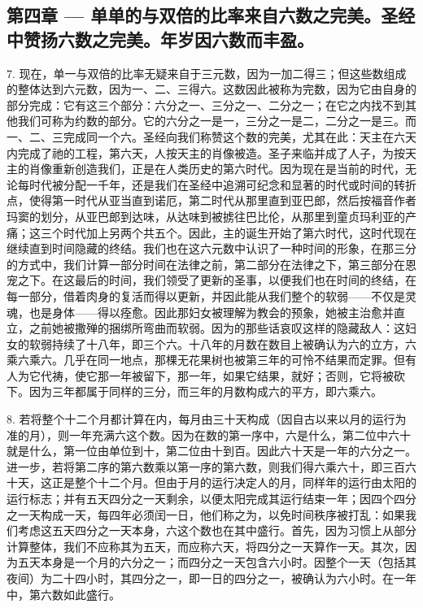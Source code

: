 
\subsection{第四章 — 单单的与双倍的比率来自六数之完美。圣经中赞扬六数之完美。年岁因六数而丰盈。}

7. 现在，单一与双倍的比率无疑来自于三元数，因为一加二得三；但这些数组成的整体达到六元数，因为一、二、三得六。这数因此被称为完数，因为它由自身的部分完成：它有这三个部分：六分之一、三分之一、二分之一；在它之内找不到其他我们可称为约数的部分。它的六分之一是一，三分之一是二，二分之一是三。而一、二、三完成同一个六。圣经向我们称赞这个数的完美，尤其在此：天主在六天内完成了祂的工程，第六天，人按天主的肖像被造。圣子来临并成了人子，为按天主的肖像重新创造我们，正是在人类历史的第六时代。因为现在是当前的时代，无论每时代被分配一千年，还是我们在圣经中追溯可纪念和显著的时代或时间的转折点，使得第一时代从亚当直到诺厄，第二时代从那里直到亚巴郎，然后按福音作者玛窦的划分，从亚巴郎到达味，从达味到被掳往巴比伦，从那里到童贞玛利亚的产痛；这三个时代加上另两个共五个。因此，主的诞生开始了第六时代，这时代现在继续直到时间隐藏的终结。我们也在这六元数中认识了一种时间的形象，在那三分的方式中，我们计算一部分时间在法律之前，第二部分在法律之下，第三部分在恩宠之下。在这最后的时间，我们领受了更新的圣事，以便我们也在时间的终结，在每一部分，借着肉身的复活而得以更新，并因此能从我们整个的软弱——不仅是灵魂，也是身体——得以痊愈。因此那妇女被理解为教会的预象，她被主治愈并直立，之前她被撒殚的捆绑所弯曲而软弱。因为的那些话哀叹这样的隐藏敌人：这妇女的软弱持续了十八年，即三个六。十八年的月数在数目上被确认为六的立方，六乘六乘六。几乎在同一地点，那棵无花果树也被第三年的可怜不结果而定罪。但有人为它代祷，使它那一年被留下，那一年，如果它结果，就好；否则，它将被砍下。因为三年都属于同样的三分，而三年的月数构成六的平方，即六乘六。\par

8. 若将整个十二个月都计算在内，每月由三十天构成（因自古以来以月的运行为准的月），则一年充满六这个数。因为在数的第一序中，六是什么，第二位中六十就是什么，第一位由单位到十，第二位由十到百。因此六十天是一年的六分之一。进一步，若将第二序的第六数乘以第一序的第六数，则我们得六乘六十，即三百六十天，这正是整个十二个月。但由于月的运行决定人的月，同样年的运行由太阳的运行标志；并有五天四分之一天剩余，以便太阳完成其运行结束一年；因四个四分之一天构成一天，每四年必须闰一日，他们称之为，以免时间秩序被打乱：如果我们考虑这五天四分之一天本身，六这个数也在其中盛行。首先，因为习惯上从部分计算整体，我们不应称其为五天，而应称六天，将四分之一天算作一天。其次，因为五天本身是一个月的六分之一；而四分之一天包含六小时。因整个一天（包括其夜间）为二十四小时，其四分之一，即一日的四分之一，被确认为六小时。在一年中，第六数如此盛行。\par

